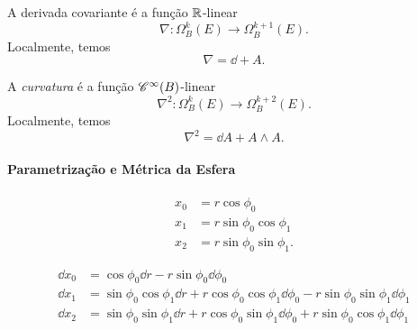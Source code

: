 \cleardoublepage


A derivada covariante é a função $\mathbb{R}$-linear
	\begin{equation*}
	\nabla\colon \Omega^k_B(E) \to \Omega^{k+1}_B(E).
	\end{equation*}
Localmente, temos
	\begin{equation*}
	\nabla = \dd + A.
	\end{equation*}

A \emph{curvatura} é a função $\mathscr{C}^\infty(B)$-linear
	\begin{equation*}
	\nabla^2\colon \Omega^k_B(E) \to \Omega^{k+2}_B(E).
	\end{equation*}
Localmente, temos
	\begin{equation*}
	\nabla^2 = \dd A + A \wedge A.
	\end{equation*}








































\cleardoublepage

\paragraph{Parametrização e Métrica da Esfera}

	\begin{align*}
	x_0 &= r\cos \phi_0 \\
	x_1 &= r\sin \phi_0 \cos \phi_1 \\
	x_2 &= r\sin \phi_0 \sin \phi_1.
	\end{align*}

	\begin{align*}
	\dd x_0 &= \cos \phi_0 \dd r - r\sin\phi_0 \dd\phi_0 \\
	\dd x_1 &= \sin \phi_0 \cos \phi_1 \dd r + r\cos \phi_0 \cos \phi_1 \dd\phi_0 - r\sin \phi_0 \sin \phi_1 \dd \phi_1 \\
	\dd x_2 &= \sin \phi_0 \sin \phi_1 \dd r + r\cos \phi_0 \sin \phi_1 \dd \phi_0 + r\sin \phi_0 \cos \phi_1 \dd \phi_1
	\end{align*}

